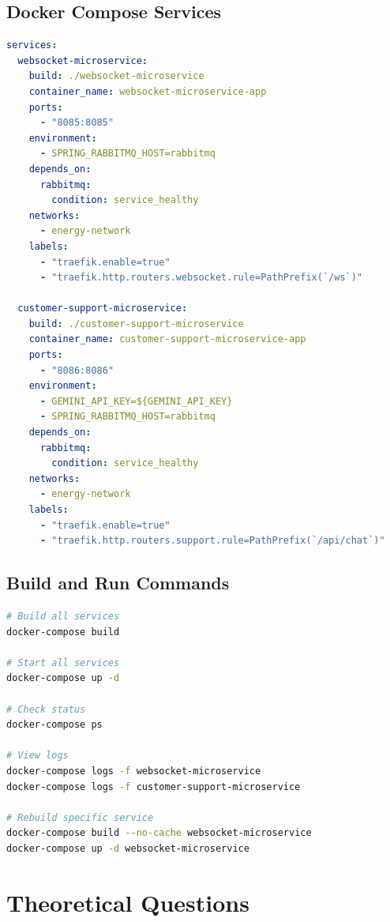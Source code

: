 \documentclass[12pt,a4paper]{article}
\begin{document}
\subsection{Docker Compose Services}
\begin{lstlisting}[language=yaml, caption=docker-compose.yml (New Services)]
services:
  websocket-microservice:
    build: ./websocket-microservice
    container_name: websocket-microservice-app
    ports:
      - "8085:8085"
    environment:
      - SPRING_RABBITMQ_HOST=rabbitmq
    depends_on:
      rabbitmq:
        condition: service_healthy
    networks:
      - energy-network
    labels:
      - "traefik.enable=true"
      - "traefik.http.routers.websocket.rule=PathPrefix(`/ws`)"

  customer-support-microservice:
    build: ./customer-support-microservice
    container_name: customer-support-microservice-app
    ports:
      - "8086:8086"
    environment:
      - GEMINI_API_KEY=${GEMINI_API_KEY}
      - SPRING_RABBITMQ_HOST=rabbitmq
    depends_on:
      rabbitmq:
        condition: service_healthy
    networks:
      - energy-network
    labels:
      - "traefik.enable=true"
      - "traefik.http.routers.support.rule=PathPrefix(`/api/chat`)"
\end{lstlisting}

\subsection{Build and Run Commands}
\begin{lstlisting}[language=bash, caption=Deployment Commands]
# Build all services
docker-compose build

# Start all services
docker-compose up -d

# Check status
docker-compose ps

# View logs
docker-compose logs -f websocket-microservice
docker-compose logs -f customer-support-microservice

# Rebuild specific service
docker-compose build --no-cache websocket-microservice
docker-compose up -d websocket-microservice
\end{lstlisting}

\section{Theoretical Questions}
\end{document}

